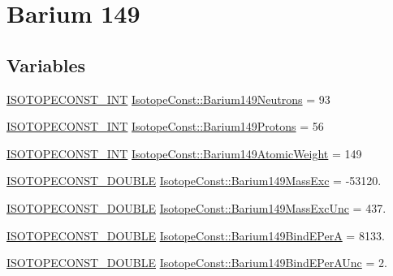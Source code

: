 \hypertarget{group___isotope_const-_barium-_ba149}{}\section{Barium 149}
\label{group___isotope_const-_barium-_ba149}
\subsection*{Variables}
\begin{DoxyCompactItemize}
\item 
\mbox{\hyperlink{group___isotope_const-_macros_ga5f18360b3e99483a35c32d789e62621c}{I\+S\+O\+T\+O\+P\+E\+C\+O\+N\+S\+T\+\_\+\+I\+NT}} \mbox{\hyperlink{group___isotope_const-_barium-_ba149_ga83e99340d63f8796b19f65b81d9f68c8}{Isotope\+Const\+::\+Barium149\+Neutrons}} = 93
\item 
\mbox{\hyperlink{group___isotope_const-_macros_ga5f18360b3e99483a35c32d789e62621c}{I\+S\+O\+T\+O\+P\+E\+C\+O\+N\+S\+T\+\_\+\+I\+NT}} \mbox{\hyperlink{group___isotope_const-_barium-_ba149_ga76d871946b17a22f8deca7531999a5f6}{Isotope\+Const\+::\+Barium149\+Protons}} = 56
\item 
\mbox{\hyperlink{group___isotope_const-_macros_ga5f18360b3e99483a35c32d789e62621c}{I\+S\+O\+T\+O\+P\+E\+C\+O\+N\+S\+T\+\_\+\+I\+NT}} \mbox{\hyperlink{group___isotope_const-_barium-_ba149_gab0036e55fc2a0b03bb571995429ec1d9}{Isotope\+Const\+::\+Barium149\+Atomic\+Weight}} = 149
\item 
\mbox{\hyperlink{group___isotope_const-_macros_ga8f45a7272ce02c0b4c65c44636ed719a}{I\+S\+O\+T\+O\+P\+E\+C\+O\+N\+S\+T\+\_\+\+D\+O\+U\+B\+LE}} \mbox{\hyperlink{group___isotope_const-_barium-_ba149_gab63eaa70ec2cd950660c8c6a3e9a9f88}{Isotope\+Const\+::\+Barium149\+Mass\+Exc}} = -\/53120.
\item 
\mbox{\hyperlink{group___isotope_const-_macros_ga8f45a7272ce02c0b4c65c44636ed719a}{I\+S\+O\+T\+O\+P\+E\+C\+O\+N\+S\+T\+\_\+\+D\+O\+U\+B\+LE}} \mbox{\hyperlink{group___isotope_const-_barium-_ba149_ga74c034aa51d5f01b3084691d72011062}{Isotope\+Const\+::\+Barium149\+Mass\+Exc\+Unc}} = 437.
\item 
\mbox{\hyperlink{group___isotope_const-_macros_ga8f45a7272ce02c0b4c65c44636ed719a}{I\+S\+O\+T\+O\+P\+E\+C\+O\+N\+S\+T\+\_\+\+D\+O\+U\+B\+LE}} \mbox{\hyperlink{group___isotope_const-_barium-_ba149_gaf501f2757f893e47864c59f3aba3b4b6}{Isotope\+Const\+::\+Barium149\+Bind\+E\+PerA}} = 8133.
\item 
\mbox{\hyperlink{group___isotope_const-_macros_ga8f45a7272ce02c0b4c65c44636ed719a}{I\+S\+O\+T\+O\+P\+E\+C\+O\+N\+S\+T\+\_\+\+D\+O\+U\+B\+LE}} \mbox{\hyperlink{group___isotope_const-_barium-_ba149_ga0323626c87ec1731a17149bd8be33551}{Isotope\+Const\+::\+Barium149\+Bind\+E\+Per\+A\+Unc}} = 2.

\end{DoxyCompactItemize}
